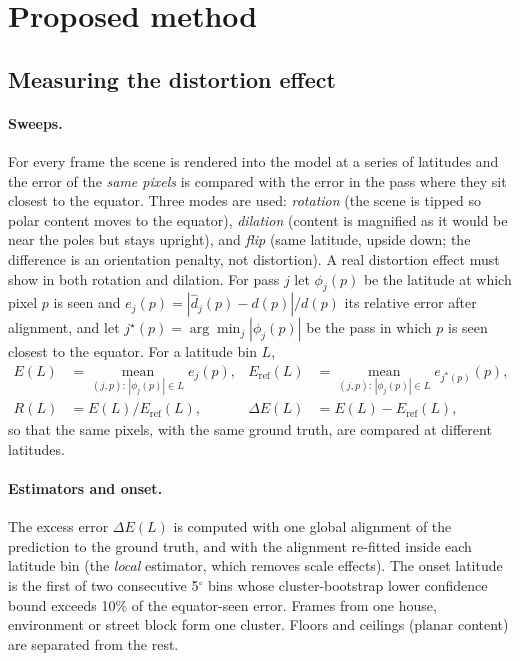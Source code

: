 \documentclass{article}
\begin{document}
\section{Proposed method}\label{sec:method}
\subsection{Measuring the distortion effect}\label{sec:measure}
\paragraph{Sweeps.} For every frame the scene is rendered into the model at a series of latitudes and the error of the \emph{same pixels} is compared with the error in the pass where they sit closest to the equator. Three modes are used: \emph{rotation} (the scene is tipped so polar content moves to the equator), \emph{dilation} (content is magnified as it would be near the poles but stays upright), and \emph{flip} (same latitude, upside down; the difference is an orientation penalty, not distortion). A real distortion effect must show in both rotation and dilation. For pass $j$ let $\phi_j(p)$ be the latitude at which pixel $p$ is seen and $e_j(p)=|\hat d_j(p)-d(p)|/d(p)$ its relative error after alignment, and let $j^\star(p)=\arg\min_j|\phi_j(p)|$ be the pass in which $p$ is seen closest to the equator. For a latitude bin $L$,
\begin{align}
E(L)&=\operatorname*{mean}_{(j,p):\,|\phi_j(p)|\in L} e_j(p), &
E_{\mathrm{ref}}(L)&=\operatorname*{mean}_{(j,p):\,|\phi_j(p)|\in L} e_{j^\star(p)}(p),\\
R(L)&=E(L)/E_{\mathrm{ref}}(L), &
\Delta E(L)&=E(L)-E_{\mathrm{ref}}(L),
\end{align}
so that the same pixels, with the same ground truth, are compared at different latitudes.
\paragraph{Estimators and onset.} The excess error $\Delta E(L)$ is computed with one global alignment of the prediction to the ground truth, and with the alignment re-fitted inside each latitude bin (the \emph{local} estimator, which removes scale effects). The onset latitude is the first of two consecutive 5$^\circ$ bins whose cluster-bootstrap lower confidence bound exceeds 10\% of the equator-seen error. Frames from one house, environment or street block form one cluster. Floors and ceilings (planar content) are separated from the rest.
\end{document}
